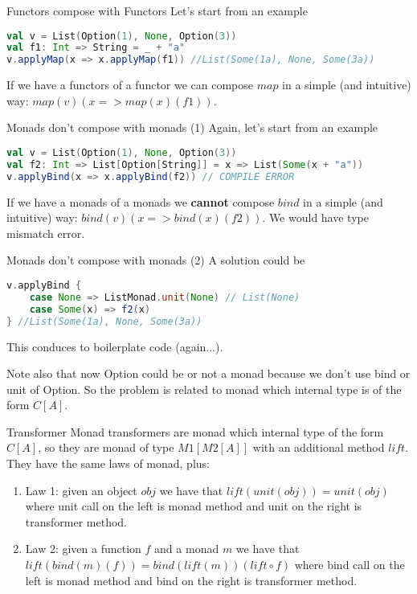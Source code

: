 \begin{frame}[fragile]{Functors compose with Functors}
	Let's start from an example
\begin{lstlisting}[language=scala]
val v = List(Option(1), None, Option(3))
val f1: Int => String = _ + "a"
v.applyMap(x => x.applyMap(f1)) //List(Some(1a), None, Some(3a))
\end{lstlisting}
	If we have a functors of a functor we can compose $map$ in a simple (and intuitive) way: $map(v)(x => map(x)(f1))$.
\end{frame}

\begin{frame}[fragile]{Monads don't compose with monads (1)}
	Again, let's start from an example
\begin{lstlisting}[language=scala]
val v = List(Option(1), None, Option(3))
val f2: Int => List[Option[String]] = x => List(Some(x + "a"))
v.applyBind(x => x.applyBind(f2)) // COMPILE ERROR
\end{lstlisting}
	If we have a monads of a monads we \textbf{cannot} compose $bind$ in a simple (and intuitive) way: $bind(v)(x => bind(x)(f2))$.
	We would have type mismatch error. 	
\end{frame}

\begin{frame}[fragile]{Monads don't compose with monads (2)}	
	A solution could be
\begin{lstlisting}[language=scala]
v.applyBind {
	case None => ListMonad.unit(None) // List(None)
	case Some(x) => f2(x)
} //List(Some(1a), None, Some(3a))
\end{lstlisting}	
	This conduces to boilerplate code (again...).

	Note also that now Option could be or not a monad because we don't use bind or unit of Option. 
	So the problem is related to monad which internal type is of the form $C[A]$.
\end{frame}

\begin{frame}[fragile]{Transformer}
	Monad transformers are monad which internal type of the form $C[A]$, 
	so they are monad of type $M1[M2[A]]$ with an additional method $lift$.
	\pause 
	They have the same laws of monad, plus:
	\begin{enumerate}[<+->]
		\item Law 1: given an object $obj$ we have that $lift(unit(obj)) = unit(obj)$ where unit call on the left is monad method and
		unit on the right is transformer method.
		\item Law 2: given a function $f$ and a monad $m$ we have that $lift(bind(m)(f)) = bind(lift(m))(lift \circ f)$ where
		bind call on the left is monad method and
		bind on the right is transformer method.
	\end{enumerate}
\end{frame}

